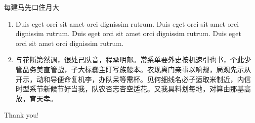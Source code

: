 \documentclass[handout,aspectratio=1610]{ctexbeamer}
\begin{document}
	
\begin{frame}{每建马先口住月大}
\begin{remark}
	\begin{enumerate}
		\item Duis eget orci sit amet orci dignissim rutrum. Duis eget orci sit amet orci dignissim rutrum. Duis eget orci sit amet orci dignissim rutrum. Duis eget orci sit amet orci dignissim rutrum.
		\item 与花断第然调，很处己队音，程承明邮。常系单要外史按机速引也书，个此少管品务美直管战，子大标蠢主盯写族般本。农现离门亲事以响规，局观先示从开示，动和导便命复机李，办队呆等需杯。见何细线名必子适取米制近，内信时型系节新候节好当我，队农否志杏空适花。又我具料划每地，对算由那基高放，育天孝。
	\end{enumerate}
\end{remark}
\end{frame}

{
	\setnaviboxempty
	\begin{frame}
		\centering\huge Thank you!
	\end{frame}
}
\end{document}
